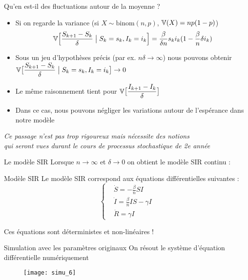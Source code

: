 \documentclass[10pt]{beamer}
\begin{document}
\begin{frame}{Qu'en est-il des fluctuations autour de la moyenne ?}
  \begin{itemize}
    \item Si on regarde la variance (si $X \sim \text{binom}(n, p)$, $\mathbb{V}(X) = n p (1- p)$)
    \[
        \mathbb{V}\Big[\dfrac{S_{k+1} - S_k}{\delta}\; \bigr\vert \; S_k=s_k, I_k=i_k\Big] = \frac{\beta}{\delta n} s_k i_k (1 - \frac{\beta}{n} \delta i_k)
    \]
    \vspace{-.5cm}
  \item Sous un jeu d'hypothèses précis (par ex. $n \delta \to \infty$)
    nous pouvons obtenir $\mathbb{V}\big[\dfrac{S_{k+1} - S_k}{\delta}\; \bigr\vert \; S_k=s_k, I_k=i_k\big] \to 0$
  \item Le même raisonnement tient pour $\mathbb{V}\big[\dfrac{I_{k+1} - I_k}{\delta}\big]$
  \item Dans ce cas, nous pouvons négliger les variations autour de l'espérance dans notre modèle
  \end{itemize}

  \pause
  \emph{Ce passage n'est pas trop rigoureux mais nécessite des notions \\
    qui seront vues durant le cours de processus stochastique de 2e année}
\end{frame}

\begin{frame}{Le modèle SIR}
  Lorsque $n\to \infty$ et $\delta \to 0$
  on obtient le modèle SIR continu :

  \begin{block}{Modèle SIR}
    Le modèle SIR correspond aux équations différentielles suivantes :
    \[
      \left\{
        \begin{aligned}
          & \dot{S} = - \frac{\beta}{n} S I \\
          & \dot{I} = \frac{\beta}{n} I S - \gamma I \\
          & \dot{R} = \gamma I
        \end{aligned}
      \right.
    \]
  \end{block}
  Ces équations sont déterministes et non-linéaires !
\end{frame}

\begin{frame}{Simulation avec les paramètres originaux}
  On résout le système d'équation différentielle numériquement
  \begin{figure}
    \texttt{[image: simu\_6]}
  \end{figure}
\end{frame}
\end{document}
